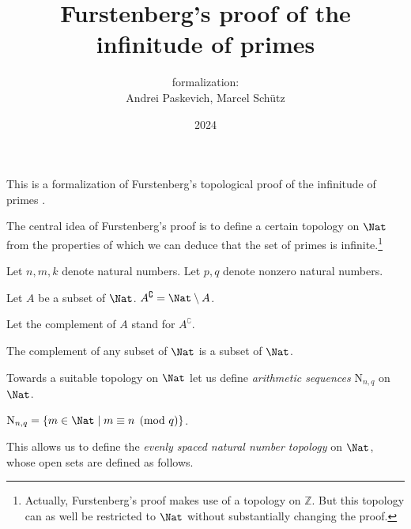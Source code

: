 \documentclass{article}
\title{Furstenberg's proof of the infinitude of primes}
\author{\Naproche formalization:\\[0.5em]Andrei Paskevich, Marcel Schütz}
\date{2024}
\newcommand{\N}{\mathrm{N}}
\newcommand{\Int}{\mathbb{Z}}
\begin{document}
  \maketitle


  \noindent This is a formalization of Furstenberg's topological proof of the
  infinitude of primes \cite[p. 353]{Furstenberg1955}.

  The central idea of Furstenberg's proof is to define a certain topology on
  $\Nat$ from the properties of which we can deduce that the set of
  primes is infinite.\footnote{Actually, Furstenberg's proof makes use of a
  topology on $\Int$. But this topology can as well be restricted to
  $\Nat$ without substantially changing the proof.}

  \begin{forthel}
    Let $n, m, k$ denote natural numbers.
    Let $p, q$ denote nonzero natural numbers.

    \begin{definition}
      Let $A$ be a subset of $\Nat$.
      $A^\complement = \Nat \setminus A$.
    \end{definition}

    Let the complement of $A$ stand for $A^\complement$.

    \begin{lemma}
      The complement of any subset of $\Nat$ is a subset of $\Nat$.
    \end{lemma}
  \end{forthel}

  Towards a suitable topology on $\Nat$ let us define \textit{arithmetic
  sequences} $\N_{n, q}$ on $\Nat$.

  \begin{forthel}
    \begin{definition}
      $\N_{n, q} = \{ m \in \Nat \mid m \equiv n \pmod{q} \}$.
    \end{definition}
  \end{forthel}

  This allows us to define the \textit{evenly spaced natural number
  topology} on $\Nat$, whose open sets are defined as follows.
\end{document}
